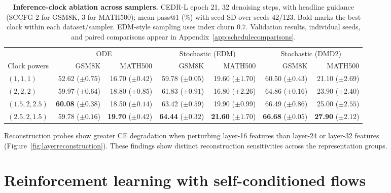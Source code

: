 \documentclass[11pt,letterpaper]{article}
\begin{document}
\begin{table}[!htbp]
\centering\small
\setlength{\tabcolsep}{3pt}
\caption{\textbf{Inference-clock ablation across samplers.} CEDR-L epoch 21, 32 denoising steps, with headline guidance (SCCFG 2 for GSM8K, 3 for MATH500); mean pass@1 (\%) with seed SD over seeds 42/123. Bold marks the best clock within each dataset/sampler. EDM-style sampling uses index churn $0.7$. Validation results, individual seeds, and paired comparisons appear in Appendix~\ref{app:schedulecomparisons}.}
\label{tab:inferenceclocks}
\begin{tabular}{@{}lrrrrrr@{}}
\toprule
& \multicolumn{2}{c}{ODE} & \multicolumn{2}{c}{Stochastic (EDM)} & \multicolumn{2}{c}{Stochastic (DMD2)} \\
\cmidrule(lr){2-3}\cmidrule(lr){4-5}\cmidrule(lr){6-7}
Clock powers & GSM8K & MATH500 & GSM8K & MATH500 & GSM8K & MATH500 \\
\midrule
$(1,1,1)$ & 52.62 {\scriptsize($\pm 0.75$)} & 16.70 {\scriptsize($\pm 0.42$)} & 59.78 {\scriptsize($\pm 0.05$)} & 19.60 {\scriptsize($\pm 1.70$)} & 60.50 {\scriptsize($\pm 0.43$)} & 21.10 {\scriptsize($\pm 2.69$)} \\
$(2,2,2)$ & 59.97 {\scriptsize($\pm 0.64$)} & 18.80 {\scriptsize($\pm 0.85$)} & 61.83 {\scriptsize($\pm 0.91$)} & 16.80 {\scriptsize($\pm 2.26$)} & 64.86 {\scriptsize($\pm 0.16$)} & 23.90 {\scriptsize($\pm 2.40$)} \\
$(1.5,2,2.5)$ & \textbf{60.08} {\scriptsize($\pm 0.38$)} & 18.50 {\scriptsize($\pm 0.14$)} & 63.42 {\scriptsize($\pm 0.59$)} & 19.90 {\scriptsize($\pm 0.99$)} & 66.49 {\scriptsize($\pm 0.86$)} & 25.00 {\scriptsize($\pm 2.55$)} \\
$(2.5,2,1.5)$ & 59.78 {\scriptsize($\pm 0.16$)} & \textbf{19.70} {\scriptsize($\pm 0.42$)} & \textbf{64.44} {\scriptsize($\pm 0.32$)} & \textbf{21.60} {\scriptsize($\pm 1.70$)} & \textbf{66.68} {\scriptsize($\pm 0.05$)} & \textbf{27.90} {\scriptsize($\pm 2.12$)} \\
\bottomrule
\end{tabular}
\end{table}

Reconstruction probes show greater CE degradation when perturbing layer-16 features than layer-24 or layer-32 features (Figure~\ref{fig:layerreconstruction}). These findings show distinct reconstruction sensitivities across the representation groups.


\section{Reinforcement learning with self-conditioned flows}
\label{sec:nft}
\end{document}
